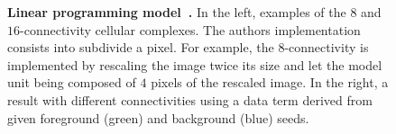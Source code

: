 \begin{figure}
\begin{minipage}{0.25\textwidth}
\center
{}

\end{minipage}%
\begin{minipage}{0.75\textwidth}
\center
{}
\end{minipage}%
\caption{\textbf{Linear programming model~\cite{schoenemann09linear}.} In the left, examples of the $8$ and $16$-connectivity cellular complexes. The authors implementation consists into subdivide a pixel. For example, the $8$-connectivity is implemented by rescaling the image twice its size and let the model unit being composed of $4$ pixels of the rescaled image. In the right, a result with different connectivities using a data term derived from given foreground (green) and background (blue) seeds. }
\end{figure}

